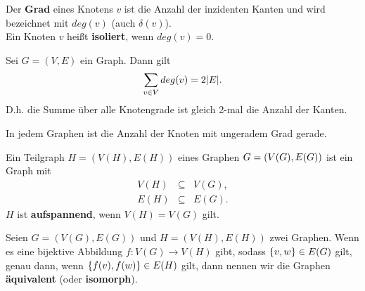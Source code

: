 	\begin{definition}[Knotengrad]
		Der \textbf{Grad} eines Knotens $v$ ist die Anzahl der inzidenten Kanten und wird bezeichnet mit $deg(v)$ (auch $\delta(v)$).\\[5pt]
		Ein Knoten $v$ heißt \textbf{isoliert}, wenn $deg(v) = 0$.
	\end{definition}
	\begin{satz}
		Sei $G = (V, E)$ ein Graph. Dann gilt
		\begin{equation*}
			\sum_{v \in V} deg(v) = 2\vert E \vert.
		\end{equation*}
		D.h. die Summe über alle Knotengrade ist gleich 2-mal die Anzahl der Kanten.
	\end{satz}
	\begin{lemma}
		In jedem Graphen ist die Anzahl der Knoten mit ungeradem Grad gerade.
	\end{lemma}
	\begin{definition}[Teilgraph]
		Ein Teilgraph $H = (V(H), E(H))$ eines Graphen $G =\\ (V(G), E(G))$ ist ein Graph mit
		\begin{eqnarray*}
			V(H) &\subseteq& V(G),\\
			E(H) &\subseteq& E(G).
		\end{eqnarray*}
		$H$ ist \textbf{aufspannend}, wenn $V(H) = V(G)$ gilt.
	\end{definition}
	\begin{definition}[Isomorph]
		Seien $G = (V(G), E(G))$ und $H = (V(H), E(H))$ zwei Graphen. Wenn es eine bijektive Abbildung $f : V(G) \to V(H)$ gibt, sodass $\{v, w\} \in E(G)$ gilt, genau dann, wenn $\{f(v), f(w)\} \in E(H)$ gilt, dann nennen wir die Graphen \textbf{äquivalent} (oder \textbf{isomorph}).
	\end{definition}
	
